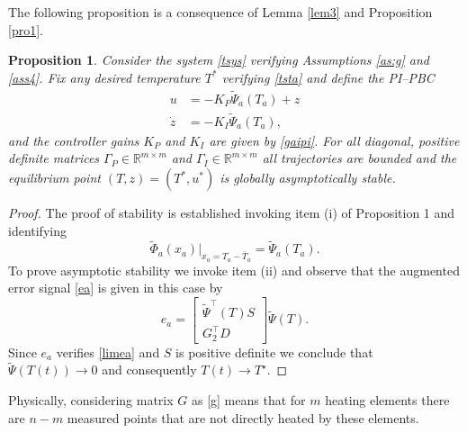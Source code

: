 \documentclass[10pt, conference]{ieeeconf}
\newtheorem{proposition}{Proposition}
\def\lab{\label}
\begin{document}
The following proposition is a consequence of Lemma \ref{lem3} and Proposition \ref{pro1}.
\begin{proposition}
\lab{pro2}
Consider the system \eqref{tsys} verifying Assumptions \ref{as:g} and \ref{ass4}. Fix any desired temperature $T^*$ verifying \eqref{tsta} and define the PI--PBC 
$$
\begin{aligned}
		u &= - K_P \tilde {\Psi}_a(T_a) + z \\
		\dot{z} &= - K_I   \tilde \Psi_a(T_a) ,
	\end{aligned}
$$
and the controller gains $K_P$ and  $K_I$ are given by \eqref{gaipi}.  {\em For all} diagonal, positive definite matrices  $\Gamma_P \in \mathbb{R}^{m \times m}$ and $\Gamma_I \in \mathbb{R}^{m \times m}$  all trajectories are bounded and the equilibrium point $(T,z)=(T^*,u^*)$ is {\em globally asymptotically stable}.
\end{proposition}
\begin{proof}
The proof of stability is established invoking item (i) of Proposition 1 and identifying
$$
\tilde \Phi_a(x_a)|_{x_a=T_a - \bar T_a}= \tilde {\Psi}_a(T_a).
$$
To prove asymptotic stability we invoke item (ii) and observe that the augmented error signal \eqref{ea} is given in this case by
\begin{equation*}
		e_a= \begin{bmatrix}   \tilde {\Psi}^\top(T) S   \\  G_2^\top D \end{bmatrix}  \tilde {\Psi}(T) .
\end{equation*}
Since $e_a$ verifies \eqref{limea} and $S$ is positive definite we conclude that $ \tilde {\Psi}(T(t)) \to 0$ and consequently $T(t)\to T^\star$.  
\end{proof}



Physically,  considering  matrix $G$ as \eqref{g}  means that for $m$ heating elements there are $n-m$ measured points that are not directly heated by these elements.
\end{document}
